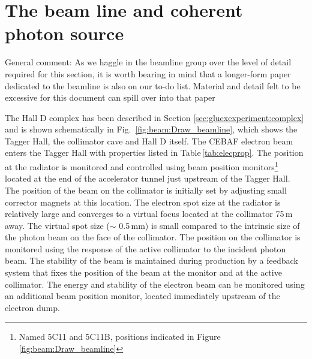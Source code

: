 
\section[The beam line and coherent photon source (Stuart)]{The beam line and coherent photon source \label{sec:beamline}}
{\color{red}General comment: As we haggle in the beamline group over the level of detail required for this section, it is worth bearing in mind that a longer-form paper dedicated to the beamline is also on our to-do list.  Material and detail felt to be excessive for this document can spill over into that paper}

The Hall D complex has been described in Section \ref{sec:gluexexperiment:complex} and is shown schematically in Fig.~\ref{fig:beam:Draw_beamline}, which shows the Tagger Hall, the collimator cave and Hall D itself. The CEBAF electron beam enters the Tagger Hall with properties listed in Table\,\ref{tab:elecprop}. The position at the radiator is monitored and
controlled using beam position monitors\footnote{Named 5C11 and 5C11B, positions indicated in Figure \ref{fig:beam:Draw_beamline}} located at the end of the accelerator tunnel just upstream of the Tagger Hall. The position of the beam on the collimator
is initially set by adjusting small corrector magnets at this location. The electron spot size at the radiator is relatively large and converges to a virtual focus located at the collimator 75\,m away. The virtual spot size ($\sim$ 0.5\,mm) is small compared to the intrinsic size of the photon beam on the face of the collimator. The position on the collimator is monitored using the response of the active collimator to the incident photon beam. The stability of the beam is maintained during production by a feedback system that fixes the position of the beam at the monitor and at the active collimator. The energy and stability of the electron beam can be monitored using an additional beam position monitor, located immediately upstream of the electron dump.

